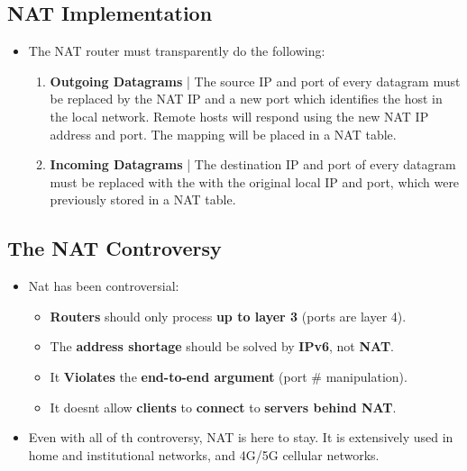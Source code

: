\documentclass{article}
\begin{document}
    \subsection*{NAT Implementation}
    \begin{itemize}
        \item The NAT router must transparently do the following:
        \begin{enumerate}
            \item \textbf{Outgoing Datagrams} | The source IP and port of every datagram must be replaced by the NAT IP and a new port which identifies the host in the local network. Remote hosts will respond using the new NAT IP address and port. The mapping will be placed in a NAT table.
            \item \textbf{Incoming Datagrams} | The destination IP and port of every datagram must be replaced with the with the original local IP and port, which were previously stored in a NAT table.
        \end{enumerate}
    \end{itemize}

    \subsection*{The NAT Controversy}
    \begin{itemize}
        \item Nat has been controversial:
        \begin{itemize}
            \item \textbf{Routers} should only process \textbf{up to layer 3} (ports are layer 4).
            \item The \textbf{address shortage} should be solved by \textbf{IPv6}, not \textbf{NAT}.
            \item It \textbf{Violates} the \textbf{end-to-end argument} (port \# manipulation).
            \item It doesnt allow \textbf{clients} to \textbf{connect} to \textbf{servers behind NAT}.
        \end{itemize}
        \item Even with all of th controversy, NAT is here to stay. It is extensively used in home and institutional networks, and 4G/5G cellular networks.
    \end{itemize}

    \section*{}
    
\end{document}

